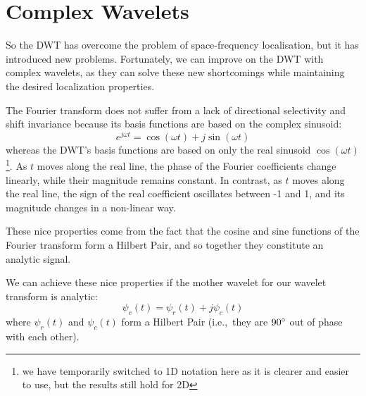   \begin{figure}
    \centering
      \label{fig:dwt_wavelets}
  \end{figure}

\section{Complex Wavelets}\label{sec:complex_wavelets}
  So the DWT has overcome the problem of space-frequency localisation, but it
  has introduced new problems.  Fortunately, we can improve on the DWT with
  complex wavelets, as they can solve these new shortcomings while maintaining
  the desired localization properties. 
  
  The Fourier transform does not suffer from a lack of directional selectivity
  and shift invariance because its basis functions are based on the complex
  sinusoid: 
  \begin{equation} 
    e^{j\omega t} = \cos(\omega t) + j\sin(\omega t)
  \end{equation} 
  whereas the DWT's basis functions are based on only the real
  sinusoid $\cos(\omega t)$\footnote{we have temporarily switched to 1D
  notation here as it is clearer and easier to use, but the results still hold
  for 2D}. As $t$ moves along the real line, the phase of the
  Fourier coefficients change linearly, while their magnitude remains constant. In
  contrast, as $t$ moves along the real line, the sign of the real coefficient
  oscillates between -1 and 1, and its magnitude changes in a non-linear way.

  These nice properties come from the fact that the cosine and sine functions of the
  Fourier transform form a Hilbert Pair, and so together they constitute an 
  analytic signal.

  We can achieve these nice properties if the mother wavelet for our wavelet
  transform is analytic:
  \begin{equation}
    \psi_{c}(t) = \psi_{r}(t) + j\psi_{c}(t) \label{eq:complex_wavelet}
  \end{equation}
  where $\psi_{r}(t)$ and $\psi_{c}(t)$ form a Hilbert Pair (i.e.,\ they are
  $90{^{\circ}}$ out of phase with each other).

